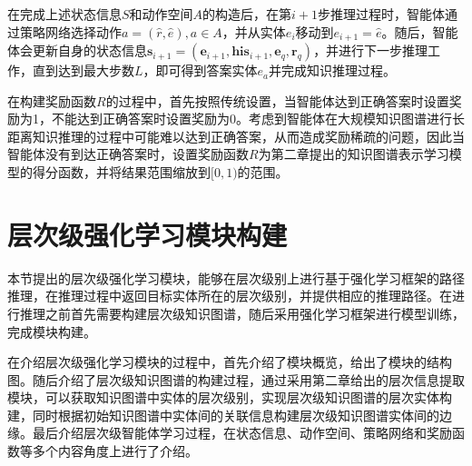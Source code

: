 \documentclass[algorithmlist, AutoFakeBold, AutoFakeSlant, figurelist, tablelist, nomlist, masters]{seuthesix}
\begin{document}
在完成上述状态信息$S$和动作空间$A$的构造后，在第$i+1$步推理过程时，智能体通过策略网络选择动作$a = (\hat{r}, \hat{e}), a \in A$，并从实体$e_i$移动到$e_{i+1} = \hat{e}$。随后，智能体会更新自身的状态信息$\bm{s}_{i+1} = (\bm{e}_{i+1}, \bm{his}_{i+1}, \bm{e}_q, \bm{r}_q)$，并进行下一步推理工作，直到达到最大步数$L$，即可得到答案实体$e_a$并完成知识推理过程。

在构建奖励函数$R$的过程中，首先按照传统设置，当智能体达到正确答案时设置奖励为1，不能达到正确答案时设置奖励为0。考虑到智能体在大规模知识图谱进行长距离知识推理的过程中可能难以达到正确答案，从而造成奖励稀疏的问题，因此当智能体没有到达正确答案时，设置奖励函数$R$为第二章提出的知识图谱表示学习模型的得分函数，并将结果范围缩放到$[0, 1)$的范围。


\section{层次级强化学习模块构建}
本节提出的层次级强化学习模块，能够在层次级别上进行基于强化学习框架的路径推理，在推理过程中返回目标实体所在的层次级别，并提供相应的推理路径。在进行推理之前首先需要构建层次级知识图谱，随后采用强化学习框架进行模型训练，完成模块构建。

在介绍层次级强化学习模块的过程中，首先介绍了模块概览，给出了模块的结构图。随后介绍了层次级知识图谱的构建过程，通过采用第二章给出的层次信息提取模块，可以获取知识图谱中实体的层次级别，实现层次级知识图谱的层次实体构建，同时根据初始知识图谱中实体间的关联信息构建层次级知识图谱实体间的边缘。最后介绍层次级智能体学习过程，在状态信息、动作空间、策略网络和奖励函数等多个内容角度上进行了介绍。
\end{document}
